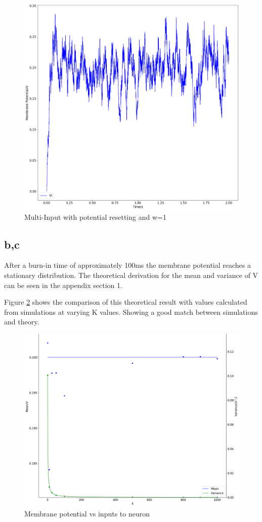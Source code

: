 \documentclass[twoside,twocolumn]{article}
\begin{document}
\begin{figure}[h]
  \centering
    \includegraphics[width=\linewidth]{3a}
  \caption{Multi-Input with potential resetting and w=1}
  \label{fig:3a}
\end{figure}
\subsection{b,c}
After a burn-in time of approximately 100ms the membrane potential reaches a stationary distribution. The theoretical derivation for the mean and variance of V can be seen in the appendix section 1.


Figure \ref{fig:3c} shows the comparison of this theoretical result with values calculated from simulations at varying K values. Showing a good match between simulations and theory.

\begin{figure}[h]
  \centering
    \includegraphics[width=\linewidth]{3c}
  \caption{Membrane potential vs inputs to neuron}
  \label{fig:3c}
\end{figure}
\end{document}
